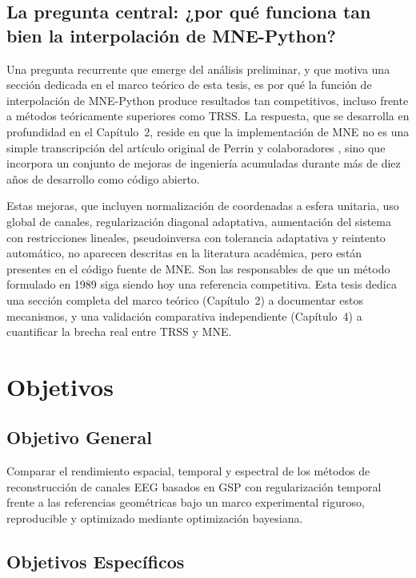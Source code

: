 \subsection{La pregunta central: ¿por qué funciona tan bien la interpolación de MNE-Python?}
\label{sec:why_mne_works}

Una pregunta recurrente que emerge del análisis preliminar, y que motiva una sección dedicada en el marco teórico de esta tesis, es por qué la función de interpolación de MNE-Python produce resultados tan competitivos, incluso frente a métodos teóricamente superiores como TRSS. La respuesta, que se desarrolla en profundidad en el Capítulo~2, reside en que la implementación de MNE no es una simple transcripción del artículo original de Perrin y colaboradores \cite{perrin1989}, sino que incorpora un conjunto de mejoras de ingeniería acumuladas durante más de diez años de desarrollo como código abierto.

Estas mejoras, que incluyen normalización de coordenadas a esfera unitaria, uso global de canales, regularización diagonal adaptativa, aumentación del sistema con restricciones lineales, pseudoinversa con tolerancia adaptativa y reintento automático, no aparecen descritas en la literatura académica, pero están presentes en el código fuente de MNE. Son las responsables de que un método formulado en 1989 siga siendo hoy una referencia competitiva. Esta tesis dedica una sección completa del marco teórico (Capítulo~2) a documentar estos mecanismos, y una validación comparativa independiente (Capítulo~4) a cuantificar la brecha real entre TRSS y MNE.

\section{Objetivos}

\subsection{Objetivo General}

Comparar el rendimiento espacial, temporal y espectral de los métodos de reconstrucción de canales EEG basados en GSP con regularización temporal frente a las referencias geométricas bajo un marco experimental riguroso, reproducible y optimizado mediante optimización bayesiana. 
\subsection{Objetivos Específicos}

